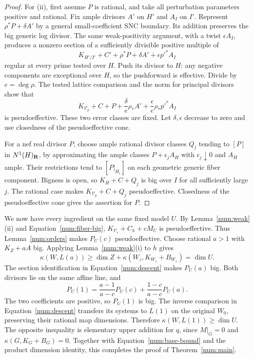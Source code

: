 \begin{proof}
For (ii), first assume $P$ is rational, and take all perturbation
parameters positive and rational. Fix ample divisors $A'$ on $H'$
and $A_I$ on $I'$.
Represent $\rho^*P+\delta A'$ by a general small-coefficient SNC
boundary.  Its addition preserves the big generic log divisor.
The same weak-positivity argument, with a twist $\epsilon A_I$,
produces a nonzero section of a sufficiently divisible positive
multiple of
\[
 K_{H'/I'}+C'+\rho^*P+\delta A'+\epsilon p'^*A_I
\]
regular at every prime tested over $H$. Push its divisor to $H$: any
negative components are exceptional over $H$, so the pushforward is
effective. Divide by $e=\deg\rho$. The tested lattice comparison
and the norm for principal divisors show that
\[
 K_{\mathcal V_p}+C+P+
 \frac{\delta}{e}\rho_*A'+\frac{\epsilon}{e}\rho_*p'^*A_I
\]
is pseudoeffective.  These two error classes are fixed.  Let
$\delta,\epsilon$ decrease to zero and use closedness of the
pseudoeffective cone.

For a nef real divisor $P$, choose ample rational divisor classes
$Q_j$ tending to $[P]$ in $N^1(H)_{\mathbf R}$, by approximating the ample
classes $P+\epsilon_j A_H$ with $\epsilon_j\downarrow0$ and $A_H$
ample. Their restrictions tend to $[P|_{H_i}]$ on each geometric
generic fiber component. Bigness is open, so $K_H+C+Q_j$ is big over
$I$ for all sufficiently large $j$. The rational case makes
$K_{\mathcal V_p}+C+Q_j$ pseudoeffective. Closedness of the
pseudoeffective cone gives the assertion for $P$.
\end{proof}
We now have every ingredient on the same fixed model $U$.
By Lemma~\ref{num:weak}(ii) and Equation~\eqref{num:fiber-big},
$K_{\mathcal V_s}+C_h+cM_U$ is pseudoeffective.  Thus
Lemma~\ref{num:orders} makes $P_U(c)$ pseudoeffective.
Choose rational $a>1$ with $K_Z+aA$ big.  Applying
Lemma~\ref{num:weak}(i) to $h$ gives
\[
 \kappa(W,L(a))
 \geq\dim Z+\kappa(W_z,K_{W_z}+B_{W_z})=\dim U.
\]
The section identification in Equation~\eqref{num:descent} makes
$P_U(a)$ big.
Both divisors lie on the same affine line, and
\[
 P_U(1)=\frac{a-1}{a-c}P_U(c)+\frac{1-c}{a-c}P_U(a).
\]
The two coefficients are positive, so $P_U(1)$ is big. The inverse
comparison in Equation~\eqref{num:descent} transfers its
systems to $L(1)$ on the original $W_0$, preserving their rational
map dimensions.  Therefore $\kappa(W,L(1))\geq\dim U$.
The opposite inequality is elementary upper addition for $q$, since
$M|_G=0$ and $\kappa(G,K_G+B_G)=0$.  Together with
Equation~\eqref{num:base-bound} and the product dimension identity,
this completes the proof of Theorem~\ref{num:main}.
